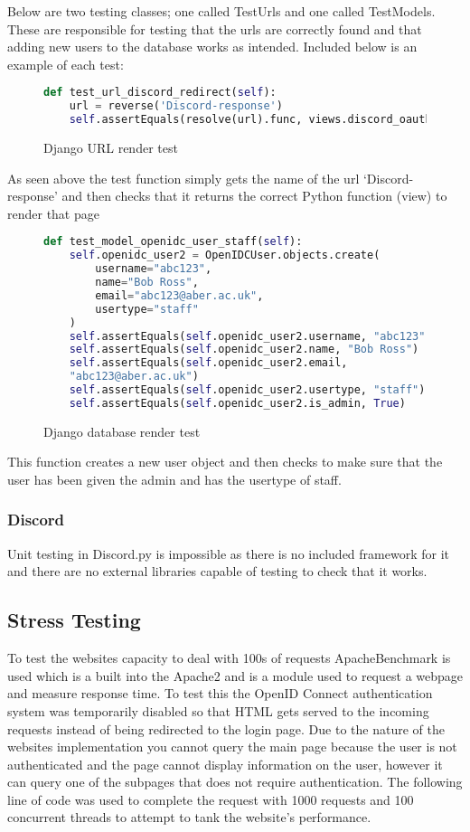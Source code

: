 Below are two testing classes; one called TestUrls and one called TestModels. These are responsible for testing that the urls are correctly found and that adding new users to the database works as intended. Included below is an example of each test:

\begin{figure}[H]
\begin{lstlisting}[language=Python]
def test_url_discord_redirect(self):
    url = reverse('Discord-response')
    self.assertEquals(resolve(url).func, views.discord_oauth2_redirect)
\end{lstlisting}
\caption{Django URL render test}
\label{fig:django-url}
\end{figure}
As seen above the test function simply gets the name of the url `Discord-response' and then checks that it returns the correct Python function (view) to render that page

\begin{figure}[H]
\begin{lstlisting}[language=Python]
def test_model_openidc_user_staff(self):
    self.openidc_user2 = OpenIDCUser.objects.create(
        username="abc123",
        name="Bob Ross",
        email="abc123@aber.ac.uk",
        usertype="staff"
    )
    self.assertEquals(self.openidc_user2.username, "abc123")
    self.assertEquals(self.openidc_user2.name, "Bob Ross")
    self.assertEquals(self.openidc_user2.email, 
    "abc123@aber.ac.uk")
    self.assertEquals(self.openidc_user2.usertype, "staff")
    self.assertEquals(self.openidc_user2.is_admin, True)
\end{lstlisting}
\caption{Django database render test}
\label{fig:django-database}
\end{figure}
This function creates a new user object and then checks to make sure that the user has been given the admin and has the usertype of staff.

\subsubsection{Discord}
Unit testing in Discord.py is impossible as there is no included framework for it and there are no external libraries capable of testing to check that it works.

\subsection{Stress Testing}
To test the websites capacity to deal with 100s of requests ApacheBenchmark \cite{apacheBenchmark} is used which is a built into the Apache2 \cite{apache2} and is a module used to request a webpage and measure response time. To test this the OpenID Connect \cite{OpenID} authentication system  was temporarily disabled so that HTML gets served to the incoming requests instead of being redirected to the login page. Due to the nature of the websites implementation you cannot query the main page because the user is not authenticated and the page cannot display information on the user, however it can query one of the subpages that does not require authentication. The following line of code was used to complete the request with 1000 requests and 100 concurrent threads to attempt to tank the website's performance.

